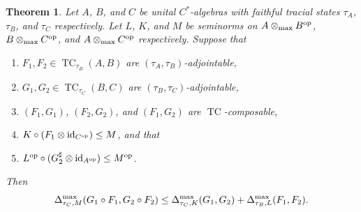 \documentclass[11pt, a4paper, oneside, final, reqno]{amsart}
\newcommand{\TC}{\operatorname{TC}}
\newcommand{\id}{\operatorname{id}}
\theoremstyle{definition}
\theoremstyle{plain}
\newtheorem{theorem}[definition]{Theorem}
\theoremstyle{remark}
\numberwithin{equation}{section}
\begin{document}
\begin{theorem}\label{thm:chaining 1}
    Let $A$, $B$, and $C$ be unital $C^*$-algebras with faithful tracial states $\tau_A$, $\tau_B$, and $\tau_C$ respectively. Let $L$, $K$, and $M$ be seminorms on $A \otimes_{\rm max} B^{\rm op}$, $B \otimes_{\rm max} C^{\rm op}$, and $A \otimes_{\rm max} C^{\rm op}$ respectively. Suppose that
    \begin{enumerate}
        \item $F_1,F_2 \in \TC_{\tau_B}(A,B)$ are $(\tau_A,\tau_B)$-adjointable,
        \item $G_1,G_2 \in \TC_{\tau_C}(B,C)$ are $(\tau_B,\tau_C)$-adjointable,
        \item $(F_1,G_1)$, $(F_2,G_2)$, and $(F_1,G_2)$ are $\TC$-composable,
        \item $K \circ (F_1 \otimes \id_{C^{\rm op}}) \leq M$, and that
        \item $L^{\rm op} \circ (G_2^\sharp \otimes \id_{A^{\rm op}})  \leq M^{\rm op}$.
    \end{enumerate}
    Then
    \begin{equation*}
        \Delta_{\tau_C,M}^{\rm max}(G_1 \circ F_1, G_2 \circ F_2)
        \leq \Delta_{\tau_C,K}^{\rm max}(G_1, G_2) + \Delta_{\tau_B,L}^{\rm max}(F_1, F_2).
    \end{equation*}
\end{theorem}
\end{document}
